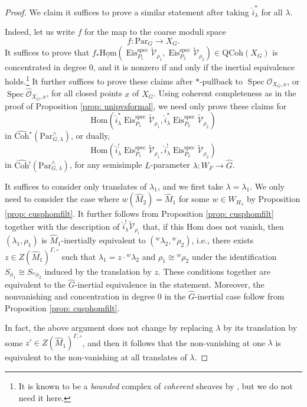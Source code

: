 \documentclass{amsart}
\theoremstyle{definition}
\theoremstyle{remark}
\numberwithin{equation}{section}
\DeclareMathOperator{\Spec}{Spec}
\newcommand{\mc}{\mathcal}
\newcommand{\Hom}{\mathrm{Hom}}
\newcommand{\spec}{\mathrm{spec}}
\newcommand{\wh}{\widehat}
\newcommand{\Par}{\mathrm{Par}}
\newcommand{\QCoh}{\mathrm{QCoh}}
\DeclareMathOperator{\Eis}{\mathrm{Eis}}
\newcommand{\Coh}{\mathrm{Coh}}
\begin{document}
\begin{proof}
We claim it suffices to prove a similar statement after taking $\wh{i}^*_\lambda$ for all $\lambda$. 

Indeed, let us write $f$ for the map to the coarse moduli space
\[
f\colon \Par_G \to X_G. 
\]
It suffices to prove that $f_*\underline{\Hom} (\Eis^\spec_{P_1}\widetilde{\mc V}_{\rho_1},\Eis^\spec_{P_2}\widetilde{\mc V}_{\rho_2})\in \QCoh(X_G)$ is concentrated in degree 0, and it is nonzero if and only if the inertial equivalence holds.\footnote{It is known to be a \emph{bounded} complex of \emph{coherent} sheaves by \cite[Theorem 3.7.3]{HansenMann}, but we do not need it here.} 
It further suffices to prove these claims after $*$-pullback to $\Spec \mathcal{O}_{X_G,x}$, or $\Spec \wh{\mathcal{O}}_{X_G,x}$, for all closed points $x$ of $X_G$. Using coherent completeness as in the proof of Proposition \ref{prop: unipvsformal}, we need only prove these claims for
\[
\Hom(\wh{i}_\lambda^* \Eis^\spec_{P_1}\widetilde{\mc V}_{\rho_1}, \wh{i}_\lambda^* \Eis^\spec_{P_2} \widetilde{\mc V}_{\rho_2})
\]
in $\wh{\Coh}{}^*(\Par_{G,\lambda}^\wedge)$, or dually, 
\[
\Hom(\wh{i}_\lambda^! \Eis^\spec_{P_1}\widetilde{\mc V}_{\rho_1}, \wh{i}_\lambda^! \Eis^\spec_{P_2} \widetilde{\mc V}_{\rho_2})
\]
in $\wh{\Coh}{}^!(\Par_{G,\lambda}^\wedge)$, for any semisimple $L$-parameter $\lambda\colon W_F\to \wh G$. 

It suffices to consider only translates of $\lambda_1$, and we first take $\lambda=\lambda_1$. We only need to consider the case where $w(\wh M_2)=\wh M_1$ for some $w\in W_{H_\lambda}$ by Proposition \ref{prop: cusphomfilt}. It further follows from Proposition \ref{prop: cusphomfilt} together with the description of $\wh{i}^!_{\lambda}\widetilde{\mc V}_{\rho_i}$ that, if this Hom does not vanish, then $(\lambda_1, \rho_1)$ is $\wh M_1$-inertially equivalent to $({}^w \lambda_2, {}^w\rho_2)$, i.e., there exists $z\in Z(\wh M_1)^{\Gamma,\circ}$ such that $\lambda_1=z\cdot {}^w\lambda_2$ and $\rho_1 \cong {}^w \rho_2$ under the identification $S_{\phi_1}\cong S_{{}^w \phi_2}$ induced by the translation by $z$. These conditions together are equivalent to the $\wh G$-inertial equivalence in the statement. Moreover, the nonvanishing and concentration in degree 0 in the $\wh G$-inertial case follow from Proposition \ref{prop: cusphomfilt}. 

In fact, the above argument does not change by replacing $\lambda$ by its translation by some $z'\in Z(\wh M_1)^{\Gamma,\circ}$, and then it follows that the non-vanishing at one $\lambda$ is equivalent to the non-vanishing at all translates of $\lambda$. 
\end{proof}
    
\end{document}
